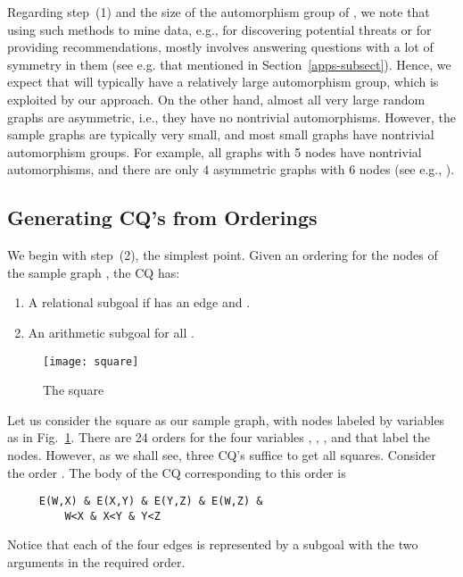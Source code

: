 Regarding step~(1) and the size of the automorphism group of , we note that using such methods to mine data, e.g., for discovering potential threats or for providing recommendations, mostly involves answering questions with a lot of symmetry in them (see e.g. that mentioned in Section~\ref{apps-subsect}). Hence, we expect that  will typically have a relatively large automorphism group, which is exploited by our approach.
On the other hand, almost all very large random graphs are asymmetric, i.e., they have no nontrivial automorphisms. However, the sample graphs are typically very small, and most small graphs have nontrivial automorphism groups. For example, all graphs with 5 nodes have nontrivial automorphisms, and there are only 4 asymmetric graphs with 6 nodes (see e.g., \cite{ER63}).

\subsection{Generating CQ's from Orderings}
\label{cq-from-order-subsect}

We begin with step~(2), the simplest point.  Given an ordering  for the nodes of the sample graph , the CQ has:

\begin{enumerate}
\item A relational subgoal  if  has an edge  and .

\item An arithmetic subgoal  for all .
\end{enumerate}

\begin{figure}[htfb]
\centerline{\texttt{[image: square]}}
\caption{The square}
\label{sq-fig}
\end{figure}

\begin{example}
\label{sq-ex}
Let us consider the square as our sample graph, with nodes labeled by variables as in Fig.~\ref{sq-fig}.  There are 24 orders for the four variables , , , and  that label the nodes.  However,  as we shall see, three CQ's suffice to get all squares.  Consider the order .  The body of the CQ corresponding to this order is

\begin{verbatim}
     E(W,X) & E(X,Y) & E(Y,Z) & E(W,Z) &
         W<X & X<Y & Y<Z
\end{verbatim}
Notice that each of the four edges is represented by a subgoal  with the two arguments in the required order.
\end{example}

